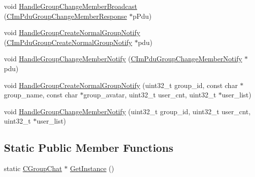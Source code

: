 \begin{DoxyCompactItemize}
\item 
void \hyperlink{class_c_group_chat_a206d4f51936cf60ce4eb9e1a5fbbc306}{Handle\+Group\+Change\+Member\+Broadcast} (\hyperlink{class_c_im_pdu_group_change_member_response}{C\+Im\+Pdu\+Group\+Change\+Member\+Response} $\ast$p\+Pdu)
\item 
void \hyperlink{class_c_group_chat_af92c210f78aa59e1763ee936c7b35947}{Handle\+Group\+Create\+Normal\+Group\+Notify} (\hyperlink{class_c_im_pdu_group_create_normal_group_notify}{C\+Im\+Pdu\+Group\+Create\+Normal\+Group\+Notify} $\ast$pdu)
\item 
void \hyperlink{class_c_group_chat_a1564bf4390b484268666c94d453d65c0}{Handle\+Group\+Change\+Member\+Notify} (\hyperlink{class_c_im_pdu_group_change_member_notify}{C\+Im\+Pdu\+Group\+Change\+Member\+Notify} $\ast$pdu)
\item 
void \hyperlink{class_c_group_chat_a6f488091522fecaca9fe003246e34cf5}{Handle\+Group\+Create\+Normal\+Group\+Notify} (uint32\+\_\+t group\+\_\+id, const char $\ast$group\+\_\+name, const char $\ast$group\+\_\+avatar, uint32\+\_\+t user\+\_\+cnt, uint32\+\_\+t $\ast$user\+\_\+list)
\item 
void \hyperlink{class_c_group_chat_ab05944cc7f274865f0dd5fc39c7f6876}{Handle\+Group\+Change\+Member\+Notify} (uint32\+\_\+t group\+\_\+id, uint32\+\_\+t user\+\_\+cnt, uint32\+\_\+t $\ast$user\+\_\+list)
\end{DoxyCompactItemize}
\subsection*{Static Public Member Functions}
\begin{DoxyCompactItemize}
\item 
static \hyperlink{class_c_group_chat}{C\+Group\+Chat} $\ast$ \hyperlink{class_c_group_chat_a4e84ee8a0a48a4b33bdbc590cb63d893}{Get\+Instance} ()
\end{DoxyCompactItemize}
